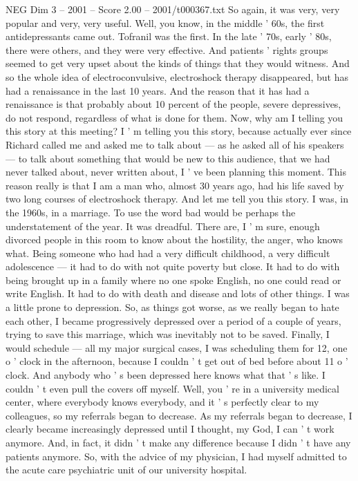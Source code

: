 \begin{textsample}{NEG Dim 3 – 2001 – Score 2.00 – 2001/t000367.txt}
So again, it was very, very popular and very, very useful.
Well, you know, in the middle ' 60s, the first antidepressants came out.
Tofranil was the first.
In the late ' 70s, early ' 80s, there were others, and they were very effective.
And patients ' rights groups seemed to get very upset about the kinds of things that they would witness.
And so the whole idea of electroconvulsive, electroshock therapy disappeared, but has had a renaissance in the last 10 years.
And the reason that it has had a renaissance is that probably about 10 percent of the people, severe depressives, do not respond, regardless of what is done for them.
Now, why am I telling you this story at this meeting?
I ' m telling you this story, because actually ever since Richard called me and asked me to talk about — as he asked all of his speakers — to talk about something that would be new to this audience, that we had never talked about, never written about, I ' ve been planning this moment.
This reason really is that I am a man who, almost 30 years ago, had his life saved by two long courses of electroshock therapy.
And let me tell you this story.
I was, in the 1960s, in a marriage.
To use the word bad would be perhaps the understatement of the year.
It was dreadful.
There are, I ' m sure, enough divorced people in this room to know about the hostility, the anger, who knows what.
Being someone who had had a very difficult childhood, a very difficult adolescence — it had to do with not quite poverty but close.
It had to do with being brought up in a family where no one spoke English, no one could read or write English.
It had to do with death and disease and lots of other things.
I was a little prone to depression.
So, as things got worse, as we really began to hate each other, I became progressively depressed over a period of a couple of years, trying to save this marriage, which was inevitably not to be saved.
Finally, I would schedule — all my major surgical cases, I was scheduling them for 12, one o ' clock in the afternoon, because I couldn ' t get out of bed before about 11 o ' clock.
And anybody who ' s been depressed here knows what that ' s like.
I couldn ' t even pull the covers off myself.
Well, you ' re in a university medical center, where everybody knows everybody, and it ' s perfectly clear to my colleagues, so my referrals began to decrease.
As my referrals began to decrease, I clearly became increasingly depressed until I thought, my God, I can ' t work anymore.
And, in fact, it didn ' t make any difference because I didn ' t have any patients anymore.
So, with the advice of my physician, I had myself admitted to the acute care psychiatric unit of our university hospital.

\end{textsample}
